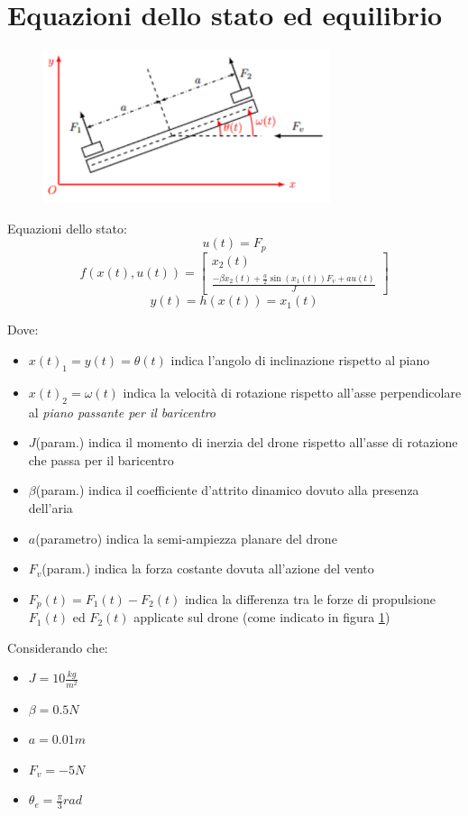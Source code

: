 \documentclass{article}
\begin{document}
\section{Equazioni dello stato ed equilibrio}
\begin{figure}[h]
    \centering
    \includegraphics[width=0.75\textwidth]{figura drone}
    \caption{}
    \label{fig:drone}
\end{figure}
Equazioni dello stato:
\[u(t)=F_{p}\]
\[f(x(t),u(t))=\begin{bmatrix}
x_{2}(t)\\ \frac{ - \beta x_{2}(t) + \frac{a}{2}\sin{ (x_{1}(t)) } F_{v} + a u(t)} {J}
\end{bmatrix}\]
\[y(t)=h(x(t))=x_{1}(t)\]

Dove:
\begin{itemize}
\item $x(t)_{1}=y(t)=\theta(t)$ indica l'angolo di inclinazione rispetto al piano
\item $x(t)_{2}=\omega(t)$ indica la velocità di rotazione rispetto all'asse perpendicolare al \textit{piano passante per il baricentro}
\item $J$(param.) indica il momento di inerzia del drone rispetto all'asse di rotazione che passa per il baricentro
\item $\beta$(param.) indica il coefficiente d'attrito dinamico dovuto alla presenza dell'aria
\item $a$(parametro) indica la semi-ampiezza planare del drone
\item $F_{v}$(param.) indica la forza costante
dovuta all'azione del vento
\item $F_{p}(t)=F_{1}(t)-F_{2}(t)$ indica la differenza tra le forze
di propulsione $F_{1}(t)$ ed $F_{2}(t)$ applicate sul drone (come indicato in figura \ref{fig:drone})
\end{itemize} 

Considerando che:
\begin{itemize}
\item $J=10 \frac{kg}{m^2}$
\item $\beta=0.5 N$
\item $a=0.01 m$
\item $F_{v}=-5 N$
\item $\theta_{e}=\frac{\pi}{3} rad$
\end{itemize}
\end{document}
